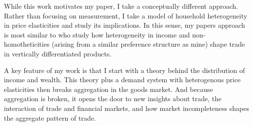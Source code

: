 \documentclass[12pt,pdftex]{article}
\begin{document}
\begin{onehalfspacing}
While this work motivates my paper, I take a conceptually different approach. Rather than focusing on measurement, I take a model of household heterogeneity in price elasticities and study its implications. In this sense, my papers approach is most similar to \citet{fajgelbaum2011income} who study how heterogeneity in income and non-homotheticities (arising from a similar preference structure as mine) shape trade in vertically differentiated products.

A key feature of my work is that I start with a theory behind the distribution of income and wealth. This theory plus a demand system with heterogenous price elasticities then breaks aggregation in the goods market. And because aggregation is broken, it opens the door to new insights about trade, the interaction of trade and financial markets, and how market incompleteness shapes the aggregate pattern of trade.



%
%
%
%
%
%
%
%




%


\end{onehalfspacing}
\end{document}
